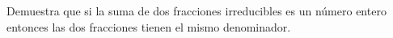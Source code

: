 Demuestra que si la suma de dos fracciones irreducibles es un número entero entonces las dos fracciones tienen el mismo denominador.
